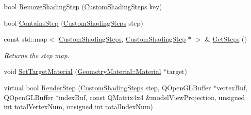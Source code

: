 \begin{DoxyCompactItemize}
\item 
bool \mbox{\hyperlink{class_geometry_engine_1_1_custom_shading_1_1_custom_shading_interface_ae5f0bbc37cd6333fd389acabb2723c34}{Remove\+Shading\+Step}} (\mbox{\hyperlink{namespace_geometry_engine_1_1_custom_shading_a2dc236a5b567da5099069ce2b2be5609}{Custom\+Shading\+Steps}} key)
\item 
bool \mbox{\hyperlink{class_geometry_engine_1_1_custom_shading_1_1_custom_shading_interface_a3702af941a05a692b3e9c8f9597a0f76}{Contains\+Step}} (\mbox{\hyperlink{namespace_geometry_engine_1_1_custom_shading_a2dc236a5b567da5099069ce2b2be5609}{Custom\+Shading\+Steps}} step)
\item 
\mbox{\label{class_geometry_engine_1_1_custom_shading_1_1_custom_shading_interface_a0efd71a7ee436cafe72eab78e7336132}} 
const std\+::map$<$ \mbox{\hyperlink{namespace_geometry_engine_1_1_custom_shading_a2dc236a5b567da5099069ce2b2be5609}{Custom\+Shading\+Steps}}, \mbox{\hyperlink{class_geometry_engine_1_1_custom_shading_1_1_custom_shading_step}{Custom\+Shading\+Step}} $\ast$ $>$ \& \mbox{\hyperlink{class_geometry_engine_1_1_custom_shading_1_1_custom_shading_interface_a0efd71a7ee436cafe72eab78e7336132}{Get\+Steps}} ()
\begin{DoxyCompactList}\small\item\em Returns the step map. \end{DoxyCompactList}\item 
void \mbox{\hyperlink{class_geometry_engine_1_1_custom_shading_1_1_custom_shading_interface_af4985887a7c390af80fed9dc55a42e58}{Set\+Target\+Material}} (\mbox{\hyperlink{class_geometry_engine_1_1_geometry_material_1_1_material}{Geometry\+Material\+::\+Material}} $\ast$target)
\item 
virtual bool \mbox{\hyperlink{class_geometry_engine_1_1_custom_shading_1_1_custom_shading_interface_a78a7ebc766069eb80ee641b5765445dd}{Render\+Step}} (\mbox{\hyperlink{namespace_geometry_engine_1_1_custom_shading_a2dc236a5b567da5099069ce2b2be5609}{Custom\+Shading\+Steps}} step, Q\+Open\+G\+L\+Buffer $\ast$vertex\+Buf, Q\+Open\+G\+L\+Buffer $\ast$index\+Buf, const Q\+Matrix4x4 \&model\+View\+Projection, unsigned int total\+Vertex\+Num, unsigned int total\+Index\+Num)
\item 
\mbox{\label{class_geometry_engine_1_1_custom_shading_1_1_custom_shading_interface_a33f156385620cc991853573bbb8cb1a0}} 

\end{DoxyCompactItemize}

